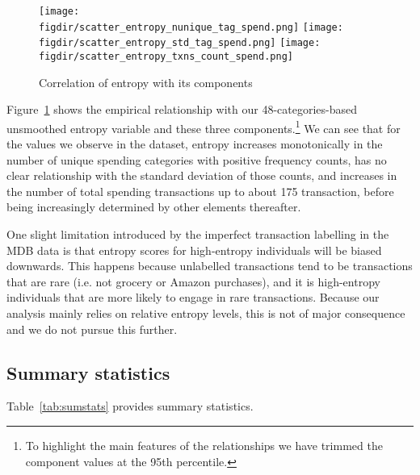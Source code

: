 \begin{figure}[h]
    \centering 
    \caption{Correlation of entropy with its components}
    \label{fig:entropy_components}
    \texttt{[image: \\figdir/scatter\_entropy\_nunique\_tag\_spend.png]}
    \texttt{[image: \\figdir/scatter\_entropy\_std\_tag\_spend.png]}
    \texttt{[image: \\figdir/scatter\_entropy\_txns\_count\_spend.png]}
\end{figure}

Figure~\ref{fig:entropy_components} shows the empirical relationship with our
48-categories-based unsmoothed entropy variable and these three
components.\footnote{To highlight the main features of the relationships we
have trimmed the component values at the 95th percentile.} We can see that for
the values we observe in the dataset, entropy increases monotonically in the
number of unique spending categories with positive frequency counts, has no
clear relationship with the standard deviation of those counts, and increases
in the number of total spending transactions up to about 175 transaction,
before being increasingly determined by other elements thereafter.

One slight limitation introduced by the imperfect transaction labelling in the
MDB data is that entropy scores for high-entropy individuals will be biased
downwards. This happens because unlabelled transactions tend to be transactions
that are rare (i.e. not grocery or Amazon purchases), and it is high-entropy
individuals that are more likely to engage in rare transactions. Because our
analysis mainly relies on relative entropy levels, this is not of major
consequence and we do not pursue this further.


\subsection{Summary statistics}%
\label{par:summary_statistics}

Table~\ref{tab:sumstats} provides summary statistics.



